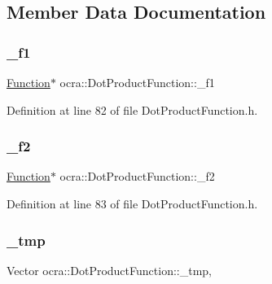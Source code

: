 \subsection{Member Data Documentation}
\hypertarget{classocra_1_1DotProductFunction_a3e39a9ce09fc27131afbe8e7a6758681}{}\label{classocra_1_1DotProductFunction_a3e39a9ce09fc27131afbe8e7a6758681} 
\subsubsection{\texorpdfstring{\+\_\+f1}{\_f1}}
{\footnotesize\ttfamily \hyperlink{classocra_1_1Function}{Function}$\ast$ ocra\+::\+Dot\+Product\+Function\+::\+\_\+f1\hspace{0.3cm}{\ttfamily [protected]}}



Definition at line 82 of file Dot\+Product\+Function.\+h.

\hypertarget{classocra_1_1DotProductFunction_a7de350aefad539fdd84453b11019e936}{}\label{classocra_1_1DotProductFunction_a7de350aefad539fdd84453b11019e936} 
\subsubsection{\texorpdfstring{\+\_\+f2}{\_f2}}
{\footnotesize\ttfamily \hyperlink{classocra_1_1Function}{Function}$\ast$ ocra\+::\+Dot\+Product\+Function\+::\+\_\+f2\hspace{0.3cm}{\ttfamily [protected]}}



Definition at line 83 of file Dot\+Product\+Function.\+h.

\hypertarget{classocra_1_1DotProductFunction_a82d2cb16e4b9b6d50e59fabfb25fc222}{}\label{classocra_1_1DotProductFunction_a82d2cb16e4b9b6d50e59fabfb25fc222} 
\subsubsection{\texorpdfstring{\+\_\+tmp}{\_tmp}}
{\footnotesize\ttfamily Vector ocra\+::\+Dot\+Product\+Function\+::\+\_\+tmp\hspace{0.3cm}{\ttfamily [mutable]}, {\ttfamily [protected]}}



